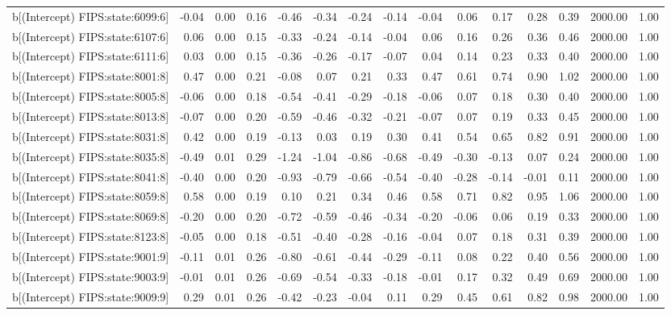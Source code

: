 \begin{table}[ht]
\begin{tabular}{rrrrrrrrrrrrrrr}
  b[(Intercept) FIPS:state:6099:6] & -0.04 & 0.00 & 0.16 & -0.46 & -0.34 & -0.24 & -0.14 & -0.04 & 0.06 & 0.17 & 0.28 & 0.39 & 2000.00 & 1.00 \\ 
  b[(Intercept) FIPS:state:6107:6] & 0.06 & 0.00 & 0.15 & -0.33 & -0.24 & -0.14 & -0.04 & 0.06 & 0.16 & 0.26 & 0.36 & 0.46 & 2000.00 & 1.00 \\ 
  b[(Intercept) FIPS:state:6111:6] & 0.03 & 0.00 & 0.15 & -0.36 & -0.26 & -0.17 & -0.07 & 0.04 & 0.14 & 0.23 & 0.33 & 0.40 & 2000.00 & 1.00 \\ 
  b[(Intercept) FIPS:state:8001:8] & 0.47 & 0.00 & 0.21 & -0.08 & 0.07 & 0.21 & 0.33 & 0.47 & 0.61 & 0.74 & 0.90 & 1.02 & 2000.00 & 1.00 \\ 
  b[(Intercept) FIPS:state:8005:8] & -0.06 & 0.00 & 0.18 & -0.54 & -0.41 & -0.29 & -0.18 & -0.06 & 0.07 & 0.18 & 0.30 & 0.40 & 2000.00 & 1.00 \\ 
  b[(Intercept) FIPS:state:8013:8] & -0.07 & 0.00 & 0.20 & -0.59 & -0.46 & -0.32 & -0.21 & -0.07 & 0.07 & 0.19 & 0.33 & 0.45 & 2000.00 & 1.00 \\ 
  b[(Intercept) FIPS:state:8031:8] & 0.42 & 0.00 & 0.19 & -0.13 & 0.03 & 0.19 & 0.30 & 0.41 & 0.54 & 0.65 & 0.82 & 0.91 & 2000.00 & 1.00 \\ 
  b[(Intercept) FIPS:state:8035:8] & -0.49 & 0.01 & 0.29 & -1.24 & -1.04 & -0.86 & -0.68 & -0.49 & -0.30 & -0.13 & 0.07 & 0.24 & 2000.00 & 1.00 \\ 
  b[(Intercept) FIPS:state:8041:8] & -0.40 & 0.00 & 0.20 & -0.93 & -0.79 & -0.66 & -0.54 & -0.40 & -0.28 & -0.14 & -0.01 & 0.11 & 2000.00 & 1.00 \\ 
  b[(Intercept) FIPS:state:8059:8] & 0.58 & 0.00 & 0.19 & 0.10 & 0.21 & 0.34 & 0.46 & 0.58 & 0.71 & 0.82 & 0.95 & 1.06 & 2000.00 & 1.00 \\ 
  b[(Intercept) FIPS:state:8069:8] & -0.20 & 0.00 & 0.20 & -0.72 & -0.59 & -0.46 & -0.34 & -0.20 & -0.06 & 0.06 & 0.19 & 0.33 & 2000.00 & 1.00 \\ 
  b[(Intercept) FIPS:state:8123:8] & -0.05 & 0.00 & 0.18 & -0.51 & -0.40 & -0.28 & -0.16 & -0.04 & 0.07 & 0.18 & 0.31 & 0.39 & 2000.00 & 1.00 \\ 
  b[(Intercept) FIPS:state:9001:9] & -0.11 & 0.01 & 0.26 & -0.80 & -0.61 & -0.44 & -0.29 & -0.11 & 0.08 & 0.22 & 0.40 & 0.56 & 2000.00 & 1.00 \\ 
  b[(Intercept) FIPS:state:9003:9] & -0.01 & 0.01 & 0.26 & -0.69 & -0.54 & -0.33 & -0.18 & -0.01 & 0.17 & 0.32 & 0.49 & 0.69 & 2000.00 & 1.00 \\ 
  b[(Intercept) FIPS:state:9009:9] & 0.29 & 0.01 & 0.26 & -0.42 & -0.23 & -0.04 & 0.11 & 0.29 & 0.45 & 0.61 & 0.82 & 0.98 & 2000.00 & 1.00 \\ 

\end{tabular}
\end{table}
